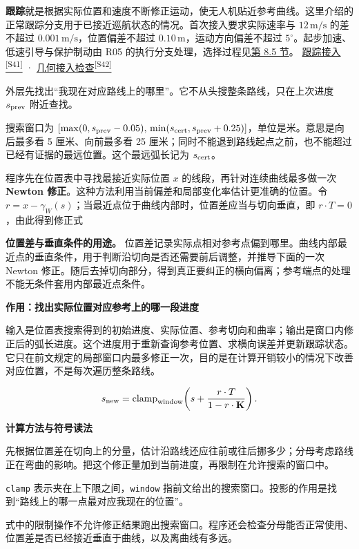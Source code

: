 \documentclass[12pt,a4paper]{article}
\numberwithin{equation}{topic}
\newcommand{\sourceref}[2]{\hyperlink{source-#1}{#2\textsuperscript{[#1]}}}
\begin{document}
\textbf{跟踪}就是根据实际位置和速度不断修正运动，使无人机贴近参考曲线。这里介绍的正常跟踪分支用于已接近巡航状态的情况。首次接入要求实际速率与 \(12\,\mathrm{m/s}\) 的差不超过 \(0.001\,\mathrm{m/s}\)，位置偏差不超过 \(0.10\,\mathrm m\)，运动方向偏差不超过 \(5^\circ\)。起步加速、低速引导与保护制动由 R05 的执行分支处理，选择过程见\hyperlink{r05-speed}{第 8.5 节}。 \sourceref{S41}{跟踪接入} · \sourceref{S42}{几何接入检查}

外层先找出“我现在对应路线上的哪里”。它不从头搜整条路线，只在上次进度 \(s_{\rm prev}\) 附近查找。

搜索窗口为 \([\max(0,s_{\rm prev}-0.05),\,\min(s_{\rm cert},s_{\rm prev}+0.25)]\)，单位是米。意思是向后最多看 5 厘米、向前最多看 25 厘米；同时不能退到路线起点之前，也不能超过已经有证据的最远位置。这个最远弧长记为 \(s_{\rm cert}\)。

程序先在位置表中寻找最接近实际位置 \(x\) 的线段，再针对连续曲线最多做一次 \textbf{Newton 修正}。这种方法利用当前偏差和局部变化率估计更准确的位置。令 \(r=x-\gamma_W(s)\)；当最近点位于曲线内部时，位置差应当与切向垂直，即 \(r\cdot T=0\)，由此得到修正式

\textbf{位置差与垂直条件的用途。} 位置差记录实际点相对参考点偏到哪里。曲线内部最近点的垂直条件，用于判断沿切向是否还需要前后调整，并推导下面的一次 Newton 修正。随后去掉切向部分，得到真正要纠正的横向偏离；参考端点的处理不能无条件套用内部最近点条件。

\noindent\textbf{作用：找出实际位置对应参考上的哪一段进度}\par\nobreak
输入是位置表搜索得到的初始进度、实际位置、参考切向和曲率；输出是窗口内修正后的弧长进度。这个进度用于重新查询参考位置、求横向误差并更新跟踪状态。它只在前文规定的局部窗口内最多修正一次，目的是在计算开销较小的情况下改善对应位置，不是每次遍历整条路线。

\begin{equation}
\label{eq:projection}
s_{\rm new}=\operatorname{clamp}_{\rm window}\!
\left(s+\frac{r\cdot T}{1-r\cdot\mathbf K}\right).
\end{equation}

\noindent\textbf{计算方法与符号读法}\par\nobreak
先根据位置差在切向上的分量，估计沿路线还应往前或往后挪多少；分母考虑路线正在弯曲的影响。把这个修正量加到当前进度，再限制在允许搜索的窗口中。

\texttt{clamp} 表示夹在上下限之间，\texttt{window} 指前文给出的搜索窗口。投影的作用是找到“路线上的哪一点最对应我现在的位置”。


式中的限制操作不允许修正结果跑出搜索窗口。程序还会检查分母能否正常使用、位置差是否已经接近垂直于曲线，以及离曲线有多远。
\end{document}
